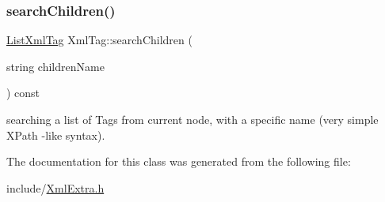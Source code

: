 \mbox{\label{classXmlTag_a9aad053ee1d3cda7ce2cb76eb61b406a}} 
\subsubsection{\texorpdfstring{search\+Children()}{searchChildren()}}
{\footnotesize\ttfamily \hyperlink{XmlExtra_8h_ade6a1aa0dc76b2c26a120f5c2f10ff7d}{List\+Xml\+Tag} Xml\+Tag\+::search\+Children (\begin{DoxyParamCaption}\item[{string}]{children\+Name }\end{DoxyParamCaption}) const}

searching a list of Tags from current node, with a specific name (very simple X\+Path -\/like syntax). 

The documentation for this class was generated from the following file\+:\begin{DoxyCompactItemize}
\item 
include/\hyperlink{XmlExtra_8h}{Xml\+Extra.\+h}\end{DoxyCompactItemize}
